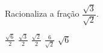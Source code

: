 Racionaliza a fração $\dfrac{\sqrt{3}}{\sqrt{2}}$.

$\frac{\sqrt{6}}{2}$
$\frac{\sqrt{3}}{2}$
$\frac{\sqrt{2}}{2}$
$\frac{6}{\sqrt{2}}$
$\sqrt{6}$


